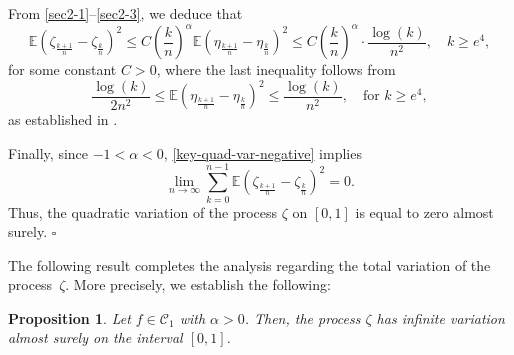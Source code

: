 \documentclass[preprint,12pt,authoryear]{elsarticle}
\def\E{\mathbb{E}}
\newtheorem{prop}{Proposition}
\newtheorem{cor}{Corollary}
\begin{document}
From \eqref{sec2-1}--\eqref{sec2-3}, we deduce that
\begin{equation}\label{key-quad-var-negative}
\E\left(\zeta_{\frac{k+1}{n}} - \zeta_{\frac{k}{n}}\right)^2 \leq C \left(\frac{k}{n}\right)^{\alpha} \E\left(\eta_{\frac{k+1}{n}} - \eta_{\frac{k}{n}}\right)^2 \leq C \left(\frac{k}{n}\right)^{\alpha} \cdot \frac{\log(k)}{n^2}, \quad k \geq e^4,
\end{equation}
for some constant \( C > 0 \), where the last inequality follows from
\begin{equation}\label{gorostiza-key}
\frac{\log(k)}{2n^2} \leq \E\left(\eta_{\frac{k+1}{n}} - \eta_{\frac{k}{n}}\right)^2 \leq \frac{\log(k)}{n^2}, \quad \text{for } k \geq e^4,
\end{equation}
as established in \cite{BGT2007}.

Finally, since \( -1 < \alpha < 0 \), \eqref{key-quad-var-negative} implies
\[
\lim_{n\rightarrow\infty} \sum_{k=0}^{n-1} \E\left(\zeta_{\frac{k+1}{n}} - \zeta_{\frac{k}{n}}\right)^2 = 0.
\]
Thus, the quadratic variation of the process \( \zeta \) on \( [0,1] \) is equal to zero almost surely.
\hfill\(\square\)




The following result completes the analysis regarding the total variation of the process~$\zeta$. More precisely, we establish the following:

\begin{prop}\label{propC}
Let \( f \in \mathcal{C}_1 \) with \( \alpha > 0 \). Then, the process \( \zeta \) has infinite variation almost surely on the interval \([0,1]\).
\end{prop}

\end{document}
